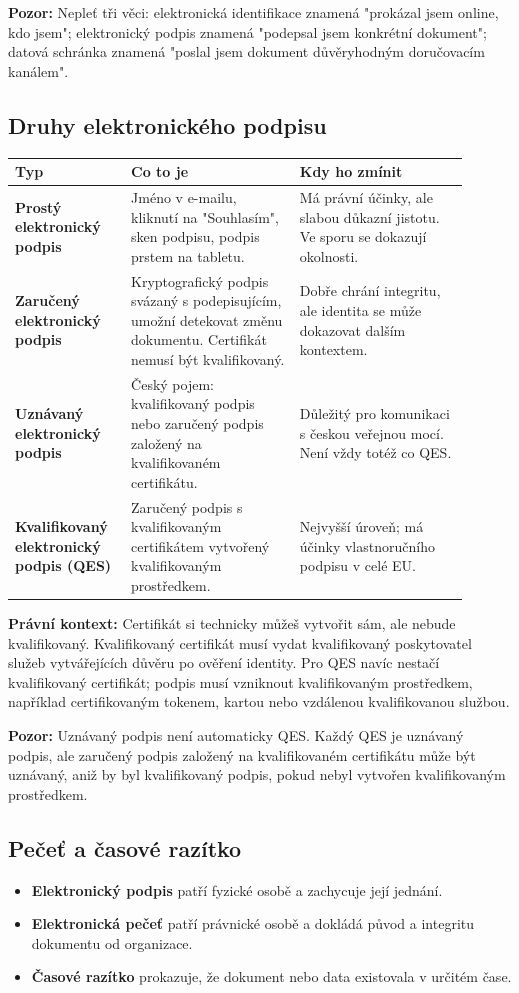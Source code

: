 \documentclass[11pt,a4paper]{article}
\newcommand{\pozor}[1]{\begin{tcolorbox}[breakable,enhanced,colback=red!7,colframe=red!30!black,boxrule=0pt,arc=1mm,left=5pt,right=5pt,top=5pt,bottom=5pt,before skip=6pt,after skip=6pt]\textbf{Pozor:} #1\end{tcolorbox}}
\newcommand{\pravobox}[1]{\begin{tcolorbox}[breakable,enhanced,colback=yellow!18,colframe=yellow!45!black,boxrule=0pt,arc=1mm,left=5pt,right=5pt,top=5pt,bottom=5pt,before skip=6pt,after skip=6pt]\textbf{Právní kontext:} #1\end{tcolorbox}}
\begin{document}
\pozor{Nepleť tři věci: elektronická identifikace znamená "prokázal jsem online, kdo jsem"; elektronický podpis znamená "podepsal jsem konkrétní dokument"; datová schránka znamená "poslal jsem dokument důvěryhodným doručovacím kanálem".}

\subsection*{Druhy elektronického podpisu}
\begin{longtable}{p{0.22\linewidth}p{0.34\linewidth}p{0.34\linewidth}}
\toprule
\textbf{Typ} & \textbf{Co to je} & \textbf{Kdy ho zmínit}\\
\midrule
\textbf{Prostý elektronický podpis} & Jméno v e-mailu, kliknutí na "Souhlasím", sken podpisu, podpis prstem na tabletu. & Má právní účinky, ale slabou důkazní jistotu. Ve sporu se dokazují okolnosti.\\
\addlinespace
\textbf{Zaručený elektronický podpis} & Kryptografický podpis svázaný s podepisujícím, umožní detekovat změnu dokumentu. Certifikát nemusí být kvalifikovaný. & Dobře chrání integritu, ale identita se může dokazovat dalším kontextem.\\
\addlinespace
\textbf{Uznávaný elektronický podpis} & Český pojem: kvalifikovaný podpis nebo zaručený podpis založený na kvalifikovaném certifikátu. & Důležitý pro komunikaci s českou veřejnou mocí. Není vždy totéž co QES.\\
\addlinespace
\textbf{Kvalifikovaný elektronický podpis (QES)} & Zaručený podpis s kvalifikovaným certifikátem vytvořený kvalifikovaným prostředkem. & Nejvyšší úroveň; má účinky vlastnoručního podpisu v celé EU.\\
\bottomrule
\end{longtable}

\pravobox{Certifikát si technicky můžeš vytvořit sám, ale nebude kvalifikovaný. Kvalifikovaný certifikát musí vydat kvalifikovaný poskytovatel služeb vytvářejících důvěru po ověření identity. Pro QES navíc nestačí kvalifikovaný certifikát; podpis musí vzniknout kvalifikovaným prostředkem, například certifikovaným tokenem, kartou nebo vzdálenou kvalifikovanou službou.}

\pozor{Uznávaný podpis není automaticky QES. Každý QES je uznávaný podpis, ale zaručený podpis založený na kvalifikovaném certifikátu může být uznávaný, aniž by byl kvalifikovaný podpis, pokud nebyl vytvořen kvalifikovaným prostředkem.}

\subsection*{Pečeť a časové razítko}
\begin{itemize}
  \item \textbf{Elektronický podpis} patří fyzické osobě a zachycuje její jednání.
  \item \textbf{Elektronická pečeť} patří právnické osobě a dokládá původ a integritu dokumentu od organizace.
  \item \textbf{Časové razítko} prokazuje, že dokument nebo data existovala v určitém čase.
\end{itemize}
\end{document}
